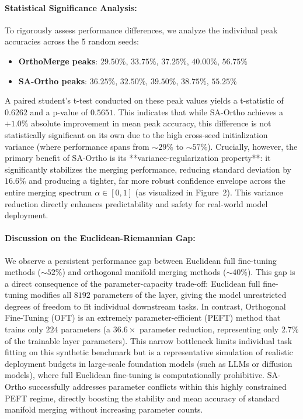 \documentclass{article}
\theoremstyle{plain}
\theoremstyle{definition}
\theoremstyle{remark}
\begin{document}
\paragraph{Statistical Significance Analysis:} To rigorously assess performance differences, we analyze the individual peak accuracies across the 5 random seeds:
\begin{itemize}
  \item \textbf{OrthoMerge peaks}: $29.50\%$, $33.75\%$, $37.25\%$, $40.00\%$, $56.75\%$
  \item \textbf{SA-Ortho peaks}: $36.25\%$, $32.50\%$, $39.50\%$, $38.75\%$, $55.25\%$
\end{itemize}
A paired student's t-test conducted on these peak values yields a t-statistic of $0.6262$ and a p-value of $0.5651$. This indicates that while SA-Ortho achieves a $+1.0\%$ absolute improvement in mean peak accuracy, this difference is not statistically significant on its own due to the high cross-seed initialization variance (where performance spans from $\sim 29\%$ to $\sim 57\%$). Crucially, however, the primary benefit of SA-Ortho is its **variance-regularization property**: it significantly stabilizes the merging performance, reducing standard deviation by $16.6\%$ and producing a tighter, far more robust confidence envelope across the entire merging spectrum $\alpha \in [0, 1]$ (as visualized in Figure~2). This variance reduction directly enhances predictability and safety for real-world model deployment.

\paragraph{Discussion on the Euclidean-Riemannian Gap:} We observe a persistent performance gap between Euclidean full fine-tuning methods ($\sim 52\%$) and orthogonal manifold merging methods ($\sim 40\%$). This gap is a direct consequence of the parameter-capacity trade-off: Euclidean full fine-tuning modifies all $8192$ parameters of the layer, giving the model unrestricted degrees of freedom to fit individual downstream tasks. In contrast, Orthogonal Fine-Tuning (OFT) is an extremely parameter-efficient (PEFT) method that trains only $224$ parameters (a $36.6\times$ parameter reduction, representing only $2.7\%$ of the trainable layer parameters). This narrow bottleneck limits individual task fitting on this synthetic benchmark but is a representative simulation of realistic deployment budgets in large-scale foundation models (such as LLMs or diffusion models), where full Euclidean fine-tuning is computationally prohibitive. SA-Ortho successfully addresses parameter conflicts within this highly constrained PEFT regime, directly boosting the stability and mean accuracy of standard manifold merging without increasing parameter counts.
\end{document}
